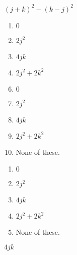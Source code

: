  
$(j+k)^2-(k-j)^2$


\ifsat
	\begin{enumerate}[label=\Alph*)]
		\item $0$
		\item $2j^2$
		\item $4jk$ %
		\item $2j^2+2k^2$
	\end{enumerate}
\else
\fi

\ifacteven
	\begin{enumerate}[label=\textbf{\Alph*.},itemsep=\fill,align=left]
		\setcounter{enumii}{5}
		\item $0$
		\item $2j^2$
		\item $4jk$ %
		\addtocounter{enumii}{1}
		\item $2j^2+2k^2$
		\item None of these. 
	\end{enumerate}
\else
\fi

\ifactodd
	\begin{enumerate}[label=\textbf{\Alph*.},itemsep=\fill,align=left]
		\item $0$
		\item $2j^2$
		\item $4jk$ %
		\item $2j^2+2k^2$
		\item None of these. 
	\end{enumerate}
\else
\fi

\ifgridin
 $4jk$ %
		
\else
\fi

